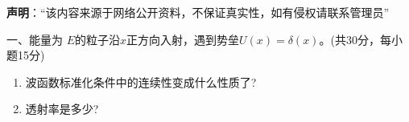 
\textbf{声明}：“该内容来源于网络公开资料，不保证真实性，如有侵权请联系管理员”

一、能量为 $E$的粒子沿$x$正方向入射，遇到势垒$U(x)=\delta(x)$。(共30分，每小题15分)
\begin{enumerate}
\item 波函数标准化条件中的连续性变成什么性质了?
\item 透射率是多少?
\end{enumerate}
